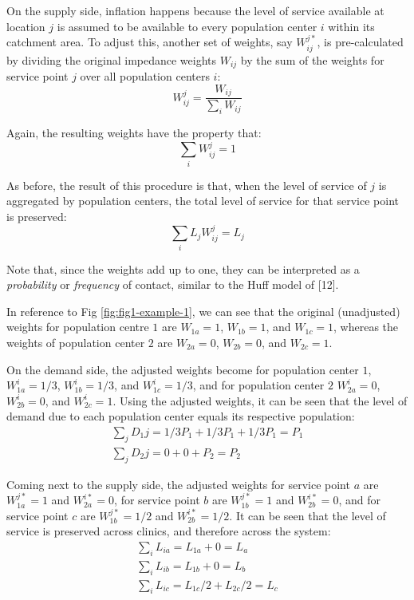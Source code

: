 \documentclass[10pt,letterpaper]{article}
\begin{document}
On the supply side, inflation happens because the level of service
available at location \(j\) is assumed to be available to every
population center \(i\) within its catchment area. To adjust this,
another set of weights, say \(W^{j*}_{ij}\), is pre-calculated by
dividing the original impedance weights \(W_{ij}\) by the sum of the
weights for service point \(j\) over all population centers \(i\): \[
W_{ij}^{j} = \frac{W_{ij}}{\sum_i W_{ij}}
\]

Again, the resulting weights have the property that: \[
\sum_iW_{ij}^{j}=1
\]

As before, the result of this procedure is that, when the level of
service of \(j\) is aggregated by population centers, the total level of
service for that service point is preserved: \[
\sum_i L_jW_{ij}^{j} = L_j 
\]

Note that, since the weights add up to one, they can be interpreted as a
\emph{probability} or \emph{frequency} of contact, similar to the Huff
model of {[}12{]}.

In reference to Fig \ref{fig:fig1-example-1}, we can see that the
original (unadjusted) weights for population centre \(1\) are
\(W_{1a} = 1\), \(W_{1b} = 1\), and \(W_{1c} = 1\), whereas the weights
of population center \(2\) are \(W_{2a} = 0\), \(W_{2b} = 0\), and
\(W_{2c} = 1\).

On the demand side, the adjusted weights become for population center
\(1\), \(W^{i}_{1a} = 1/3\), \(W^{i}_{1b} = 1/3\), and
\(W^{i}_{1c} = 1/3\), and for population center \(2\)
\(W^{i}_{2a} = 0\), \(W^{i}_{2b} = 0\), and \(W^{i}_{2c} = 1\). Using
the adjusted weights, it can be seen that the level of demand due to
each population center equals its respective population: \[
\begin{array}{ll}
            \sum_j D_1j = 1/3P_1 + 1/3P_1 + 1/3P_1 = P_1\\
            \sum_j D_2j = 0+0+P_2 = P_2
        \end{array}
\]

Coming next to the supply side, the adjusted weights for service point
\(a\) are \(W^{j*}_{1a} = 1\) and \(W^{i*}_{2a} = 0\), for service point
\(b\) are \(W^{j*}_{1b} = 1\) and \(W^{i*}_{2b} = 0\), and for service
point \(c\) are \(W^{j*}_{1b} = 1/2\) and \(W^{i*}_{2b} = 1/2\). It can
be seen that the level of service is preserved across clinics, and
therefore across the system: \[
\begin{array}{ll}
            \sum_i L_{ia} = L_{1a} + 0 = L_a\\
            \sum_i L_{ib} = L_{1b} + 0 = L_b\\
            \sum_i L_{ic} = L_{1c}/2 + L_{2c}/2 = L_c
        \end{array}
\]
\end{document}
